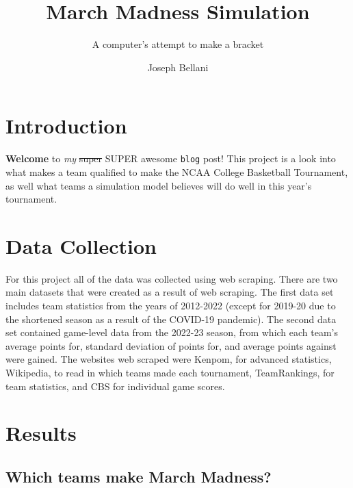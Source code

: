 \documentclass[
  letterpaper,
  DIV=11,
  numbers=noendperiod]{scrartcl}
\title{March Madness Simulation}
\subtitle{A computer's attempt to make a bracket}
\author{Joseph Bellani}
\date{}
\begin{document}
\maketitle
\ifdefined\Shaded\renewenvironment{Shaded}{\begin{tcolorbox}[enhanced, borderline west={3pt}{0pt}{shadecolor}, breakable, boxrule=0pt, interior hidden, frame hidden, sharp corners]}{\end{tcolorbox}}\fi

\hypertarget{introduction}{%
\section{Introduction}\label{introduction}}

\textbf{Welcome} to \emph{my} \sout{super} SUPER awesome \texttt{blog}
post! This project is a look into what makes a team qualified to make
the NCAA College Basketball Tournament, as well what teams a simulation
model believes will do well in this year's tournament.

\hypertarget{data-collection}{%
\section{Data Collection}\label{data-collection}}

For this project all of the data was collected using web scraping. There
are two main datasets that were created as a result of web scraping. The
first data set includes team statistics from the years of 2012-2022
(except for 2019-20 due to the shortened season as a result of the
COVID-19 pandemic). The second data set contained game-level data from
the 2022-23 season, from which each team's average points for, standard
deviation of points for, and average points against were gained. The
websites web scraped were Kenpom, for advanced statistics, Wikipedia, to
read in which teams made each tournament, TeamRankings, for team
statistics, and CBS for individual game scores.

\hypertarget{results}{%
\section{Results}\label{results}}

\hypertarget{which-teams-make-march-madness}{%
\subsection{Which teams make March
Madness?}\label{which-teams-make-march-madness}}
\end{document}
